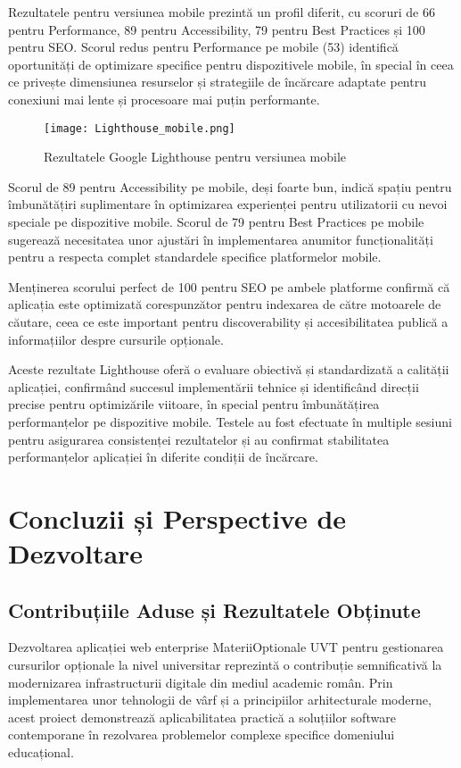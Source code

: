 \documentclass[12pt,a4paper]{report}
\begin{document}
Rezultatele pentru versiunea mobile prezintă un profil diferit, cu scoruri de 66 pentru Performance, 89 pentru Accessibility, 79 pentru Best Practices și 100 pentru SEO. Scorul redus pentru Performance pe mobile (53) identifică oportunități de optimizare specifice pentru dispozitivele mobile, în special în ceea ce privește dimensiunea resurselor și strategiile de încărcare adaptate pentru conexiuni mai lente și procesoare mai puțin performante.

\begin{figure}[H]
\centering
\texttt{[image: Lighthouse\_mobile.png]}
\caption{Rezultatele Google Lighthouse pentru versiunea mobile}
\label{fig:lighthouse-mobile}
\end{figure}

Scorul de 89 pentru Accessibility pe mobile, deși foarte bun, indică spațiu pentru îmbunătățiri suplimentare în optimizarea experienței pentru utilizatorii cu nevoi speciale pe dispozitive mobile. Scorul de 79 pentru Best Practices pe mobile sugerează necesitatea unor ajustări în implementarea anumitor funcționalități pentru a respecta complet standardele specifice platformelor mobile.

Menținerea scorului perfect de 100 pentru SEO pe ambele platforme confirmă că aplicația este optimizată corespunzător pentru indexarea de către motoarele de căutare, ceea ce este important pentru discoverability și accesibilitatea publică a informațiilor despre cursurile opționale.

Aceste rezultate Lighthouse oferă o evaluare obiectivă și standardizată a calității aplicației, confirmând succesul implementării tehnice și identificând direcții precise pentru optimizările viitoare, în special pentru îmbunătățirea performanțelor pe dispozitive mobile. Testele au fost efectuate în multiple sesiuni pentru asigurarea consistenței rezultatelor și au confirmat stabilitatea performanțelor aplicației în diferite condiții de încărcare.

\chapter{Concluzii și Perspective de Dezvoltare}

\section{Contribuțiile Aduse și Rezultatele Obținute}

Dezvoltarea aplicației web enterprise MateriiOptionale UVT pentru gestionarea cursurilor opționale la nivel universitar reprezintă o contribuție semnificativă la modernizarea infrastructurii digitale din mediul academic român. Prin implementarea unor tehnologii de vârf și a principiilor arhitecturale moderne, acest proiect demonstrează aplicabilitatea practică a soluțiilor software contemporane în rezolvarea problemelor complexe specifice domeniului educațional.
\end{document}
